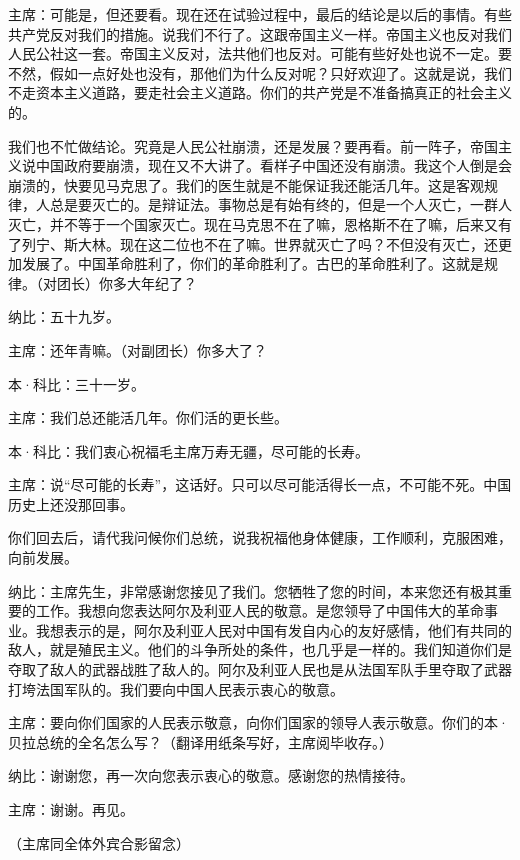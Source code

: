 主席：可能是，但还要看。现在还在试验过程中，最后的结论是以后的事情。有些共产党反对我们的措施。说我们不行了。这跟帝国主义一样。帝国主义也反对我们人民公社这一套。帝国主义反对，法共他们也反对。可能有些好处也说不一定。要不然，假如一点好处也没有，那他们为什么反对呢？只好欢迎了。这就是说，我们不走资本主义道路，要走社会主义道路。你们的共产党是不准备搞真正的社会主义的。

我们也不忙做结论。究竟是人民公社崩溃，还是发展？要再看。前一阵子，帝国主义说中国政府要崩溃，现在又不大讲了。看样子中国还没有崩溃。我这个人倒是会崩溃的，快要见马克思了。我们的医生就是不能保证我还能活几年。这是客观规律，人总是要灭亡的。是辩证法。事物总是有始有终的，但是一个人灭亡，一群人灭亡，并不等于一个国家灭亡。现在马克思不在了嘛，恩格斯不在了嘛，后来又有了列宁、斯大林。现在这二位也不在了嘛。世界就灭亡了吗？不但没有灭亡，还更加发展了。中国革命胜利了，你们的革命胜利了。古巴的革命胜利了。这就是规律。（对团长）你多大年纪了？

纳比：五十九岁。

主席：还年青嘛。（对副团长）你多大了？

本·科比：三十一岁。

主席：我们总还能活几年。你们活的更长些。

本·科比：我们衷心祝福毛主席万寿无疆，尽可能的长寿。

主席：说“尽可能的长寿”，这话好。只可以尽可能活得长一点，不可能不死。中国历史上还没那回事。

你们回去后，请代我问候你们总统，说我祝福他身体健康，工作顺利，克服困难，向前发展。

纳比：主席先生，非常感谢您接见了我们。您牺牲了您的时间，本来您还有极其重要的工作。我想向您表达阿尔及利亚人民的敬意。是您领导了中国伟大的革命事业。我想表示的是，阿尔及利亚人民对中国有发自内心的友好感情，他们有共同的敌人，就是殖民主义。他们的斗争所处的条件，也几乎是一样的。我们知道你们是夺取了敌人的武器战胜了敌人的。阿尔及利亚人民也是从法国军队手里夺取了武器打垮法国军队的。我们要向中国人民表示衷心的敬意。

主席：要向你们国家的人民表示敬意，向你们国家的领导人表示敬意。你们的本·贝拉总统的全名怎么写？（翻译用纸条写好，主席阅毕收存。）

纳比：谢谢您，再一次向您表示衷心的敬意。感谢您的热情接待。

主席：谢谢。再见。

（主席同全体外宾合影留念）


